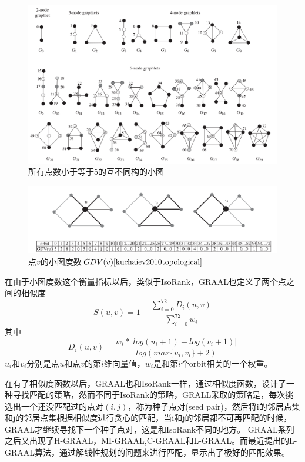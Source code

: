 \begin{figure}[htbp]
\centering
\includegraphics[width=\textwidth]{pic/graphlet.png}
\captionsetup{margin=50pt}
\caption{所有点数小于等于5的互不同构的小图\cite{kuchaiev2010topological}}\label{fig:graphlet}
\end{figure}

\begin{figure}[htbp]
\centering
\includegraphics[width=\textwidth]{pic/orbitcount.png}
\captionsetup{margin=50pt}
\caption{点$v$的小图度数$GDV(v)\cite{kuchaiev2010topological}$}\label{fig:orbitcount}
\end{figure}

在由于小图度数这个衡量指标以后，类似于IsoRank，GRAAL也定义了两个点之间的相似度
\begin{equation}\label{graal1}
S(u,v)=1-\frac{\sum_{i=0}^{72}D_i(u,v)}{\sum_{i=0}^{72}w_i}
\end{equation}
其中
\begin{equation}\label{graal1}
D_i(u,v)=\frac{w_i*\left | log(u_i+1)-log(v_i+1) \right |}{log(max\{u_i,v_i\}+2)}
\end{equation}
$u_i$和$v_i$分别是点$u$和点$v$的第$i$维向量值，$w_i$是和第$i$个orbit相关的一个权重。

在有了相似度函数以后，GRAAL也和IsoRank一样，通过相似度函数，设计了一种寻找匹配的策略，然而不同于IsoRank的策略，GRALL采取的策略是，每次挑选出一个还没匹配过的点对$(i,j)$，称为种子点对(seed pair)，然后将i的邻居点集和j的邻居点集根据相似度进行贪心的匹配，当i和j的邻居都不可再匹配的时候，GRAAL才继续寻找下一个种子点对，这是和IsoRank不同的地方。
GRAAL系列之后又出现了H-GRAAL\cite{milenkovic2010optimal}，MI-GRAAL\cite{kuchaiev2011integrative},C-GRAAL\cite{memivsevic2012c}和L-GRAAL\cite{malod2015graal}。而最近提出的L-GRAAL\cite{malod2015graal}算法，通过解线性规划的问题来进行匹配，显示出了极好的匹配效果。

